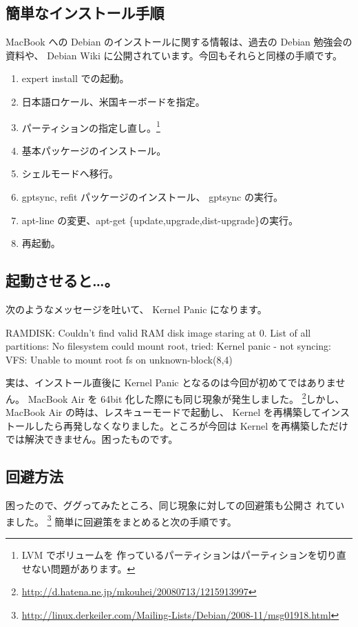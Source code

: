 \documentclass[mingoth,a4paper]{jsarticle}
\begin{document}
\subsection{簡単なインストール手順}
MacBook への Debian のインストールに関する情報は、過去の Debian 勉強会の
資料や、 Debian Wiki に公開されています。今回もそれらと同様の手順です。
\begin{enumerate}
\item expert install での起動。
\item 日本語ロケール、米国キーボードを指定。
\item パーティションの指定し直し。\footnote{LVM でボリュームを
作っているパーティションはパーティションを切り直せない問題があります。}
\item 基本パッケージのインストール。
\item シェルモードへ移行。
\item gptsync, refit パッケージのインストール、 gptsync の実行。
\item apt-line の変更、apt-get \{update,upgrade,dist-upgrade\}の実行。
\item 再起動。
\end{enumerate}

\subsection{起動させると…。}
次のようなメッセージを吐いて、 Kernel Panic になります。

\begin{commandline}
RAMDISK: Couldn't find valid RAM disk image staring at 0.
List of all partitions:
No filesystem could mount root, tried:
Kernel panic - not syncing: VFS: Unable to mount root fs on unknown-block(8,4)
\end{commandline}

実は、インストール直後に Kernel Panic となるのは今回が初めてではありません。 MacBook Air
を 64bit 化した際にも同じ現象が発生しました。
\footnote{\url{http://d.hatena.ne.jp/mkouhei/20080713/1215913997}}しかし、
MacBook Air の時は、レスキューモードで起動し、 Kernel を再構築してインス
トールしたら再発しなくなりました。ところが今回は Kernel を再構築しただけ
では解決できません。困ったものです。



\subsection{回避方法}
困ったので、ググってみたところ、同じ現象に対しての回避策も公開さ
れていました。
\footnote{\url{http://linux.derkeiler.com/Mailing-Lists/Debian/2008-11/msg01918.html}}
簡単に回避策をまとめると次の手順です。
\end{document}
